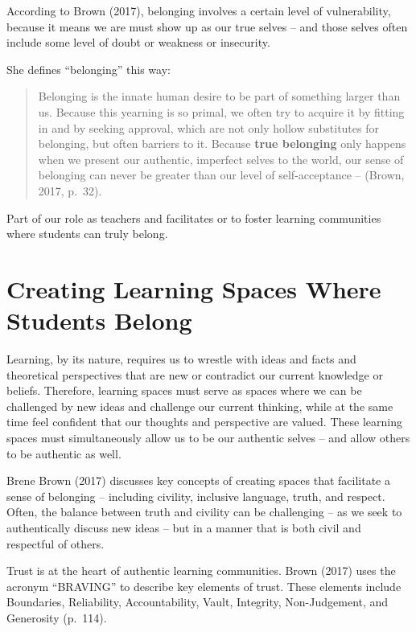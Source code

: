 \documentclass[
]{book}
\begin{document}
According to Brown (2017), belonging involves a certain level of vulnerability, because it means we are must show up as our true selves -- and those selves often include some level of doubt or weakness or insecurity.

She defines ``belonging'' this way:

\begin{quote}
Belonging is the innate human desire to be part of something larger than us. Because this yearning is so primal, we often try to acquire it by fitting in and by seeking approval, which are not only hollow substitutes for belonging, but often barriers to it. Because \textbf{true belonging} only happens when we present our authentic, imperfect selves to the world, our sense of belonging can never be greater than our level of self-acceptance -- (Brown, 2017, p.~32).
\end{quote}

Part of our role as teachers and facilitates or to foster learning communities where students can truly belong.

\hypertarget{creating-learning-spaces-where-students-belong}{%
\section{Creating Learning Spaces Where Students Belong}\label{creating-learning-spaces-where-students-belong}}

Learning, by its nature, requires us to wrestle with ideas and facts and theoretical perspectives that are new or contradict our current knowledge or beliefs. Therefore, learning spaces must serve as spaces where we can be challenged by new ideas and challenge our current thinking, while at the same time feel confident that our thoughts and perspective are valued. These learning spaces must simultaneously allow us to be our authentic selves -- and allow others to be authentic as well.

Brene Brown (2017) discusses key concepts of creating spaces that facilitate a sense of belonging -- including civility, inclusive language, truth, and respect. Often, the balance between truth and civility can be challenging -- as we seek to authentically discuss new ideas -- but in a manner that is both civil and respectful of others.

Trust is at the heart of authentic learning communities. Brown (2017) uses the acronym ``BRAVING'' to describe key elements of trust. These elements include Boundaries, Reliability, Accountability, Vault, Integrity, Non-Judgement, and Generosity (p.~114).
\end{document}
